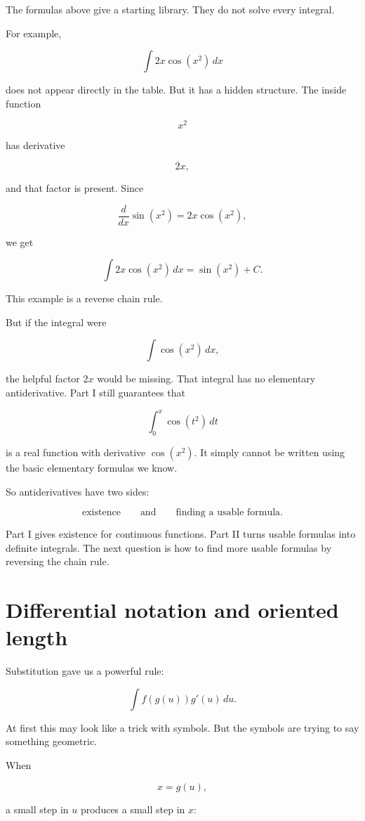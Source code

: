 The formulas above give a starting library.  They do not solve every integral.

For example,

\[
\int 2x\cos(x^2)\,dx
\]

does not appear directly in the table.  But it has a hidden structure.  The inside function

\[
x^2
\]

has derivative

\[
2x,
\]

and that factor is present.  Since

\[
\frac{d}{dx}\sin(x^2)=2x\cos(x^2),
\]

we get

\[
\int 2x\cos(x^2)\,dx=\sin(x^2)+C.
\]

This example is a reverse chain rule.

But if the integral were

\[
\int \cos(x^2)\,dx,
\]

the helpful factor \(2x\) would be missing.  That integral has no elementary
antiderivative.  Part I still guarantees that

\[
\int_0^x \cos(t^2)\,dt
\]

is a real function with derivative \(\cos(x^2)\).  It simply cannot be written using the
basic elementary formulas we know.

So antiderivatives have two sides:

\[
\text{existence}
\qquad\text{and}\qquad
\text{finding a usable formula}.
\]

Part I gives existence for continuous functions.  Part II turns usable formulas into
definite integrals.  The next question is how to find more usable formulas by reversing
the chain rule.

\section{Differential notation and oriented length}
\label{sec:differential-notation-oriented-length}

Substitution gave us a powerful rule:

\[
\int f(g(u))g'(u)\,du.
\]

At first this may look like a trick with symbols.  But the symbols are trying to say
something geometric.

When

\[
x=g(u),
\]

a small step in \(u\) produces a small step in \(x\):

